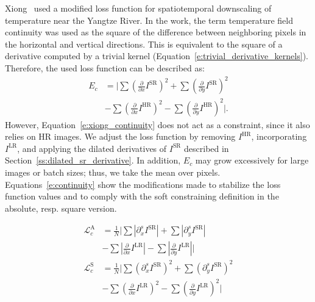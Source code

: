 Xiong~\cite{Xiong2025} used a modified loss function for spatiotemporal downscaling of temperature near the Yangtze River.
In the work, the term temperature field continuity was used as the square of the difference between neighboring pixels in the horizontal and vertical directions.
This is equivalent to the square of a derivative computed by a trivial kernel (Equation~\eqref{e:trivial_derivative_kernels}).
Therefore, the used loss function can be described as:
\begin{equation}
    \begin{aligned}
        E_c &= \biggl|\sum\left(\frac{\partial}{\partial x} I^\text{SR}\right)^2 + \sum\left(\frac{\partial}{\partial y}I^\text{SR}\right)^2 \\
        &- \sum\left(\frac{\partial}{\partial x}I^\text{HR}\right)^2 - \sum\left(\frac{\partial}{\partial y}I^\text{HR}\right)^2\biggr|.
    \end{aligned}
    \label{e:xiong_continuity}
\end{equation}
However, Equation~\eqref{e:xiong_continuity} does not act as a constraint, since it also relies on HR images.
We adjust the loss function by removing $I^\text{HR}$, incorporating $I^\text{LR}$, and applying the dilated derivatives of $I^\text{SR}$ described in Section~\ref{ss:dilated_sr_derivative}. 
In addition, $E_c$ may grow excessively for large images or batch sizes; thus, we take the mean over pixels.
Equations~\eqref{e:continuity} show the modifications made to stabilize the loss function values and to comply with the soft constraining definition in the absolute, resp. square version.

\begin{equation}
    \begin{aligned}
    \mathcal{L}_c^\text{A} &= \frac{1}{N} \biggl|\sum\left|\partial^s_xI^\text{SR}\right| + \sum\left|\partial^s_yI^\text{SR}\right| \\
    &- \sum\left|\frac{\partial}{\partial x} I^\text{LR}\right| - \sum\left|\frac{\partial}{\partial y}I^\text{LR}\right|\biggr| \\
    \mathcal{L}_c^\text{S} &= \frac{1}{N}\biggl|\sum\left(\partial^s_x I^\text{SR}\right)^2 + \sum\left(\partial^s_y I^\text{SR}\right)^2 \\
    &- \sum\left(\frac{\partial}{\partial x}I^\text{LR}\right)^2 - \sum\left(\frac{\partial}{\partial y}I^\text{LR}\right)^2\biggr|
    \end{aligned}
    \label{e:continuity}
\end{equation}

